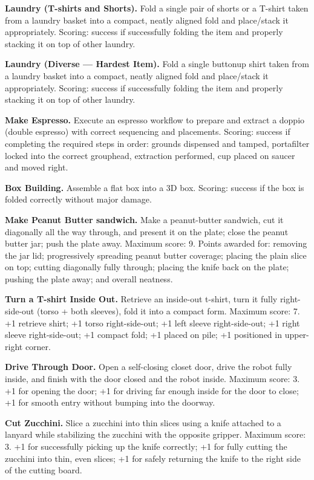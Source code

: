 
\label{app:tasks}

\noindent \textbf{Laundry (T-shirts and Shorts).} Fold a single pair of shorts or a T-shirt taken from a laundry basket into a compact, neatly aligned fold and place/stack it appropriately.
Scoring: success if successfully folding the item and properly stacking it on top of other laundry.

\noindent \textbf{Laundry (Diverse --- Hardest Item).} Fold a single buttonup shirt taken from a laundry basket into a compact, neatly aligned fold and place/stack it appropriately. Scoring: success if successfully folding the item and properly stacking it on top of other laundry.

\noindent \textbf{Make Espresso.} Execute an espresso workflow to prepare and extract a doppio (double espresso) with correct sequencing and placements.
Scoring: success if completing the required steps in order: grounds dispensed and tamped, portafilter locked into the correct grouphead, extraction performed, cup placed on saucer and moved right.

\noindent \textbf{Box Building.} Assemble a flat box into a 3D box. Scoring: success if the box is folded correctly without major damage.

\noindent \textbf{Make Peanut Butter sandwich.} Make a peanut-butter sandwich, cut it diagonally all the way through, and present it on the plate; close the peanut butter jar; push the plate away.
Maximum score: 9. Points awarded for: removing the jar lid; progressively spreading peanut butter coverage; placing the plain slice on top; cutting diagonally fully through; placing the knife back on the plate; pushing the plate away; and overall neatness.

\noindent \textbf{Turn a T-shirt Inside Out.} Retrieve an inside-out t-shirt, turn it fully right-side-out (torso + both sleeves), fold it into a compact form.
Maximum score: 7. +1 retrieve shirt; +1 torso right-side-out; +1 left sleeve right-side-out; +1 right sleeve right-side-out; +1 compact fold; +1 placed on pile; +1 positioned in upper-right corner.

\noindent \textbf{Drive Through Door.} Open a self-closing closet door, drive the robot fully inside, and finish with the door closed and the robot inside.
Maximum score: 3. +1 for opening the door; +1 for driving far enough inside for the door to close; +1 for smooth entry without bumping into the doorway.

\noindent \textbf{Cut Zucchini.} Slice a zucchini into thin slices using a knife attached to a lanyard while stabilizing the zucchini with the opposite gripper.
Maximum score: 3. +1 for successfully picking up the knife correctly; +1 for fully cutting the zucchini into thin, even slices; +1 for safely returning the knife to the right side of the cutting board.

